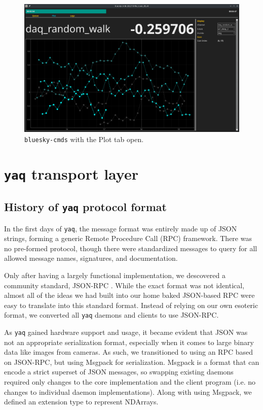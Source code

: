 \documentclass[11pt, full]{article}
\newcommand\yaq{\texttt{yaq}}
\let\stdsection\section
\renewcommand\section{\clearpage\stdsection}
\begin{document}
\begin{landscape}
\begin{figure}
\includegraphics[width=9in]{"figures/plot_tab.png"}
	\caption{\texttt{bluesky-cmds} with the Plot tab open.}
\label{acq:fig:plot_tab}
\end{figure}
\end{landscape}

\clearpage


\section{\yaq{} transport layer}

\subsection{History of \yaq{} protocol format}

In the first days of \yaq{}, the message format was entirely made up of JSON strings, forming a generic Remote Procedure Call (RPC) framework.
There was no pre-formed protocol, though there were standardized messages to query for all allowed message names, signatures, and documentation.

Only after having a largely functional implementation, we descovered a community standard, JSON-RPC \cite{jsonrpc}.
While the exact format was not identical, almost all of the ideas we had built into our home baked JSON-based RPC were easy to translate into this standard format.
Instead of relying on our own esoteric format, we converted all \yaq{} daemons and clients to use JSON-RPC.

As \yaq{} gained hardware support and usage, it became evident that JSON was not an appropriate serialization format, especially when it comes to large binary data like images from cameras.
As such, we transitioned to using an RPC based on JSON-RPC, but using Msgpack \cite{msgpack} for serialization.
Msgpack is a format that can encode a strict superset of JSON messages, so swapping existing daemons required only changes to the core implementation and the client program (i.e. no changes to individual daemon implementations).
Along with using Msgpack, we defined an extension type to represent NDArrays.
\end{document}
